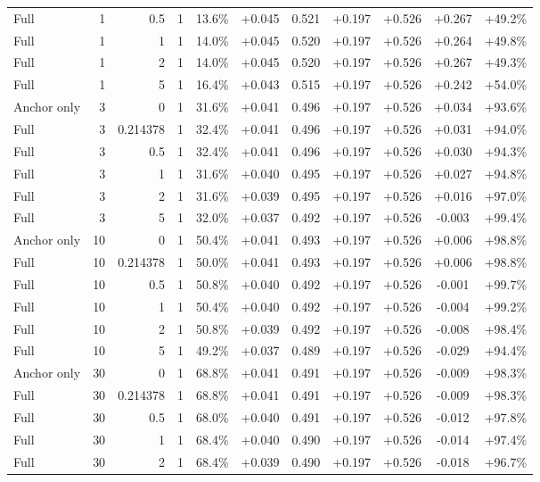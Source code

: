 \begin{table}[htbp]
\begin{tabular}{lrrrccccccc}
Full & 1 & 0.5 & 1 & 13.6\% & +0.045 & 0.521 & +0.197 & +0.526 & +0.267 & +49.2\% \\
Full & 1 & 1 & 1 & 14.0\% & +0.045 & 0.520 & +0.197 & +0.526 & +0.264 & +49.8\% \\
Full & 1 & 2 & 1 & 14.0\% & +0.045 & 0.520 & +0.197 & +0.526 & +0.267 & +49.3\% \\
Full & 1 & 5 & 1 & 16.4\% & +0.043 & 0.515 & +0.197 & +0.526 & +0.242 & +54.0\% \\
Anchor only & 3 & 0 & 1 & 31.6\% & +0.041 & 0.496 & +0.197 & +0.526 & +0.034 & +93.6\% \\
Full & 3 & 0.214378 & 1 & 32.4\% & +0.041 & 0.496 & +0.197 & +0.526 & +0.031 & +94.0\% \\
Full & 3 & 0.5 & 1 & 32.4\% & +0.041 & 0.496 & +0.197 & +0.526 & +0.030 & +94.3\% \\
Full & 3 & 1 & 1 & 31.6\% & +0.040 & 0.495 & +0.197 & +0.526 & +0.027 & +94.8\% \\
Full & 3 & 2 & 1 & 31.6\% & +0.039 & 0.495 & +0.197 & +0.526 & +0.016 & +97.0\% \\
Full & 3 & 5 & 1 & 32.0\% & +0.037 & 0.492 & +0.197 & +0.526 & -0.003 & +99.4\% \\
Anchor only & 10 & 0 & 1 & 50.4\% & +0.041 & 0.493 & +0.197 & +0.526 & +0.006 & +98.8\% \\
Full & 10 & 0.214378 & 1 & 50.0\% & +0.041 & 0.493 & +0.197 & +0.526 & +0.006 & +98.8\% \\
Full & 10 & 0.5 & 1 & 50.8\% & +0.040 & 0.492 & +0.197 & +0.526 & -0.001 & +99.7\% \\
Full & 10 & 1 & 1 & 50.4\% & +0.040 & 0.492 & +0.197 & +0.526 & -0.004 & +99.2\% \\
Full & 10 & 2 & 1 & 50.8\% & +0.039 & 0.492 & +0.197 & +0.526 & -0.008 & +98.4\% \\
Full & 10 & 5 & 1 & 49.2\% & +0.037 & 0.489 & +0.197 & +0.526 & -0.029 & +94.4\% \\
Anchor only & 30 & 0 & 1 & 68.8\% & +0.041 & 0.491 & +0.197 & +0.526 & -0.009 & +98.3\% \\
Full & 30 & 0.214378 & 1 & 68.8\% & +0.041 & 0.491 & +0.197 & +0.526 & -0.009 & +98.3\% \\
Full & 30 & 0.5 & 1 & 68.0\% & +0.040 & 0.491 & +0.197 & +0.526 & -0.012 & +97.8\% \\
Full & 30 & 1 & 1 & 68.4\% & +0.040 & 0.490 & +0.197 & +0.526 & -0.014 & +97.4\% \\
Full & 30 & 2 & 1 & 68.4\% & +0.039 & 0.490 & +0.197 & +0.526 & -0.018 & +96.7\% \\

\end{tabular}
\end{table}
